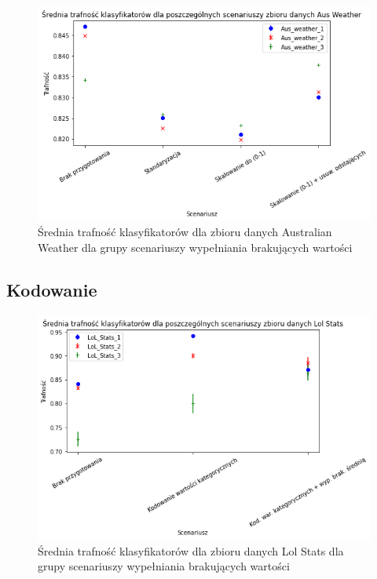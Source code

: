 \documentclass{book}
\begin{document}
\begin{figure}[H]
    \centerline{\includegraphics[scale=0.5]{Aus_Weather_Avg_Standaryzacja}}
    \centering
    \caption{Średnia trafność klasyfikatorów dla zbioru danych Australian Weather 
    dla grupy scenariuszy wypełniania brakujących wartości}
    \end{figure}

\subsection{Kodowanie}

\begin{figure}[H]
    \centerline{\includegraphics[scale=0.5]{Lol_Stats_Avg_Kodowanie}}
    \centering
    \caption{Średnia trafność klasyfikatorów dla zbioru danych Lol Stats 
    dla grupy scenariuszy wypełniania brakujących wartości}
    \end{figure}
\end{document}

